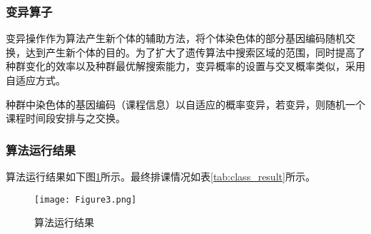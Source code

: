 \documentclass[bwprint]{cumcmthesis}
\begin{document}
\subsubsection{变异算子}
变异操作作为算法产生新个体的辅助方法，将个体染色体的部分基因编码随机交换，达到产生新个体的目的。为了扩大了遗传算法中搜索区域的范围，同时提高了种群变化的效率以及种群最优解搜索能力，变异概率的设置与交叉概率类似，采用自适应方式。

种群中染色体的基因编码（课程信息）以自适应的概率变异，若变异，则随机一个课程时间段安排与之交换。

\subsubsection{算法运行结果}
算法运行结果如下图\ref{fig:GA_pic}所示。最终排课情况如表\ref{tab:class_result}所示。
\begin{figure}[!ht]
	\centering

	\texttt{[image: Figure3.png]}
	\caption{算法运行结果}	
	\label{fig:GA_pic}
\end{figure}
\end{document}
